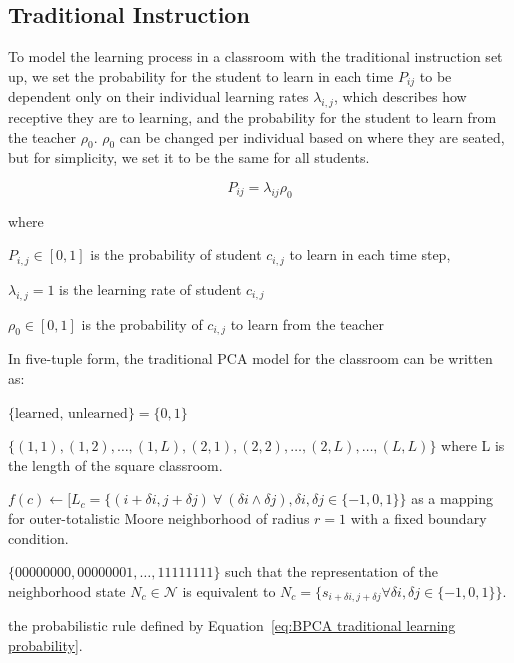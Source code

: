 \subsection{Traditional Instruction}
To model the learning process in a classroom with the traditional instruction set up, we set the probability for the student to learn in each time $P_{ij}$ to be dependent only on their individual learning rates $\lambda_{i,j}$, which describes how receptive they are to learning, and the probability for the student to learn from the teacher $\rho_0$. $\rho_0$ can be changed per individual based on where they are seated, but for simplicity, we set it to be the same for all students.

\begin{equation}
    \label{eq:BPCA traditional learning probability}
        P_{ij} = \lambda_{ij} \rho_{0}
\end{equation}

where

$P_{i,j} \in [0,1]$ is the probability of student $c_{i,j}$ to learn in each time step, 

$\lambda_{i,j} = 1$ is the learning rate of student $c_{i,j}$

$\rho_{0} \in [0,1]$ is the probability of $c_{i,j}$ to learn from the teacher

In five-tuple form, the traditional PCA model for the classroom can be written as:

\begin{CAdef}
\itemS $\lbrace \text{learned, unlearned} \rbrace = \lbrace 0, 1 \rbrace$

\itemC $\lbrace (1,1), (1,2), \dots, (1,L), (2, 1), (2,2), \dots, (2,L), \dots, (L,L)\rbrace$ where L is the length of the square classroom.

\itemL $f(c) \leftarrow \lbrack L_c = \lbrace (i+\delta i,j+\delta j) ~\forall~ (\delta i \land \delta j),  \delta i, \delta j \in \lbrace -1,0,1 \rbrace \rbrace $ as a mapping for outer-totalistic Moore neighborhood of radius $r=1$ with a fixed boundary condition.

\itemN $\lbrace 00000000, 00000001, \dots, 11111111 \rbrace$ such that the representation of the neighborhood state $N_c \in \mathcal{N}$ is equivalent to $N_c = \lbrace s_{i+\delta i, j+\delta j} \forall \delta i, \delta j \in \lbrace -1,0,1 \rbrace \rbrace$.

\itemR the probabilistic rule defined by Equation~\ref{eq:BPCA traditional learning probability}.
\end{CAdef}

